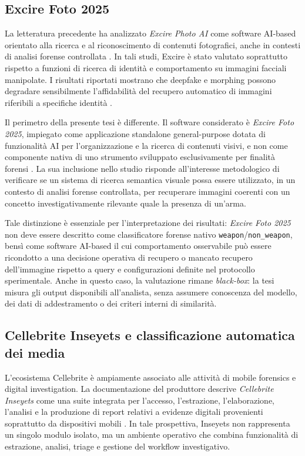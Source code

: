 \subsection{Excire Foto 2025}
\label{subsec:sota_excire_foto}

La letteratura precedente ha analizzato \textit{Excire Photo AI} come software AI-based orientato alla ricerca e al riconoscimento di contenuti fotografici, anche in contesti di analisi forense controllata \cite{sanna2024preliminary,sanna2025pixelperfect}. In tali studi, Excire è stato valutato soprattutto rispetto a funzioni di ricerca di identità e comportamento su immagini facciali manipolate. I risultati riportati mostrano che deepfake e morphing possono degradare sensibilmente l'affidabilità del recupero automatico di immagini riferibili a specifiche identità \cite{sanna2025pixelperfect}.

Il perimetro della presente tesi è differente. Il software considerato è \textit{Excire Foto 2025}, impiegato come applicazione standalone general-purpose dotata di funzionalità AI per l'organizzazione e la ricerca di contenuti visivi, e non come componente nativa di uno strumento sviluppato esclusivamente per finalità forensi \cite{excirefoto2025_official}. La sua inclusione nello studio risponde all'interesse metodologico di verificare se un sistema di ricerca semantica visuale possa essere utilizzato, in un contesto di analisi forense controllata, per recuperare immagini coerenti con un concetto investigativamente rilevante quale la presenza di un'arma.

Tale distinzione è essenziale per l'interpretazione dei risultati: \textit{Excire Foto 2025} non deve essere descritto come classificatore forense nativo \texttt{weapon}/\texttt{non\_weapon}, bensì come software AI-based il cui comportamento osservabile può essere ricondotto a una decisione operativa di recupero o mancato recupero dell'immagine rispetto a query e configurazioni definite nel protocollo sperimentale. Anche in questo caso, la valutazione rimane \textit{black-box}: la tesi misura gli output disponibili all'analista, senza assumere conoscenza del modello, dei dati di addestramento o dei criteri interni di similarità.

\subsection{Cellebrite Inseyets e classificazione automatica dei media}
\label{subsec:sota_cellebrite}

L'ecosistema Cellebrite è ampiamente associato alle attività di mobile forensics e digital investigation. La documentazione del produttore descrive \textit{Cellebrite Inseyets} come una suite integrata per l'accesso, l'estrazione, l'elaborazione, l'analisi e la produzione di report relativi a evidenze digitali provenienti soprattutto da dispositivi mobili \cite{cellebrite_inseyets_official}. In tale prospettiva, Inseyets non rappresenta un singolo modulo isolato, ma un ambiente operativo che combina funzionalità di estrazione, analisi, triage e gestione del workflow investigativo.

